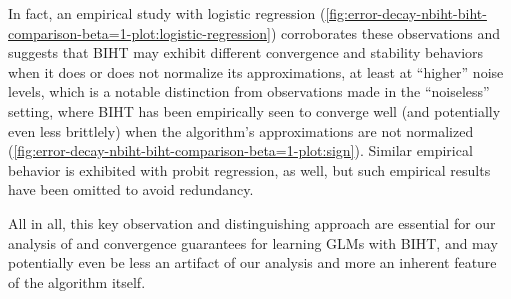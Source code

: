 %
In fact, an empirical study with logistic regression (\see \FIGURE \ref{fig:error-decay-nbiht-biht-comparison-beta=1-plot:logistic-regression}) corroborates these observations and suggests that BIHT may exhibit different convergence and stability behaviors when it does or does not normalize its approximations, at least at ``higher'' noise levels, which is a notable distinction from observations made in the ``noiseless'' setting, where BIHT has been empirically seen to converge well (and potentially even less brittlely) when the algorithm's approximations are not normalized (\see \FIGURE \ref{fig:error-decay-nbiht-biht-comparison-beta=1-plot:sign}).
Similar empirical behavior is exhibited with probit regression, as well, but such empirical results have been omitted to avoid redundancy.
%
\par %
%
All in all, this key observation and distinguishing approach are essential for our analysis of and convergence guarantees for learning GLMs with BIHT, and may potentially even be less an artifact of our analysis and
more an inherent feature of
the algorithm itself.
